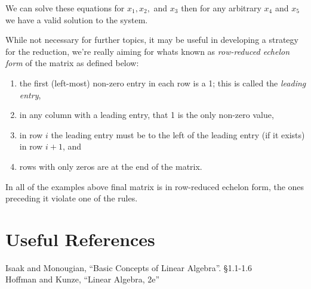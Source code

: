 We can solve these equations for $x_1, x_2,$ and $x_3$ then for any arbitrary $x_4$ and $x_5$ we have a valid solution to the system. 

\begin{aside}
While not necessary for further topics, it may be useful in developing a strategy for the reduction, 
we're really aiming for whats known as \emph{row-reduced echelon form} of the matrix as defined below:
\begin{enumerate}
\item the first (left-most) non-zero entry in each row is a 1; this is called the \textit{leading entry}, 
\item in any column with a leading entry, that 1 is the only non-zero value,
\item in row $i$ the leading entry must be to the left of the leading entry (if it exists) in row $i+1$, and 
\item rows with only zeros are at the end of the matrix.
\end{enumerate}
In all of the examples above final matrix is in row-reduced echelon form, the ones preceding it violate one of the rules. 
\end{aside}


\section*{Useful References}
Isaak and Monougian, ``Basic Concepts of Linear Algebra''. \S 1.1-1.6\\
Hoffman and Kunze, ``Linear Algebra, 2e''


